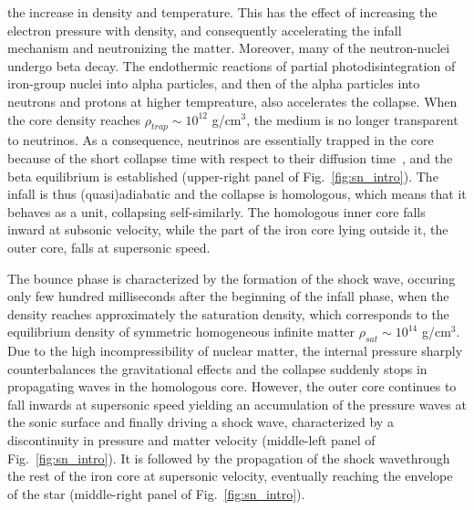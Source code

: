 the increase in density and temperature. This has the effect of increasing 
the electron pressure with density, and consequently accelerating the infall 
mechanism and neutronizing the matter. Moreover, many of the neutron-nuclei 
undergo beta decay.
The endothermic reactions of partial photodisintegration of iron-group nuclei 
into alpha particles, and then of the alpha particles into neutrons and protons 
at higher tempreature, also accelerates the collapse. When the core density 
reaches $\rho_{trap} \sim 10^{12}$ g/cm$^3$, the medium is no longer
transparent to neutrinos. As a consequence, neutrinos are essentially trapped 
in the core because of the short collapse time with respect to their diffusion
time~\cite{Bethe1990}, and the beta equilibrium is established (upper-right 
panel of Fig.~\ref{fig:sn_intro}).
The infall is thus (quasi)adiabatic and the collapse is homologous,
which means that it behaves as a unit, collapsing self-similarly. 
The homologous inner core falls inward at subsonic velocity, while
the part of the iron core lying outside it, the outer core, falls at supersonic 
speed.

The bounce phase is characterized by the formation of the shock wave, occuring 
only few hundred milliseconds after the beginning of the infall phase, when the 
density reaches approximately the saturation density, which corresponds to the 
equilibrium density of symmetric homogeneous infinite matter $\rho_{sat} \sim 
10^{14}$ g/cm$^3$. 
Due to the high incompressibility of nuclear matter, the internal pressure 
sharply counterbalances the gravitational effects and the collapse suddenly 
stops in propagating waves in the homologous core. However, the outer core 
continues to fall inwards at supersonic speed yielding an accumulation of the 
pressure waves at the sonic surface and finally driving a shock 
wave, characterized by a discontinuity in pressure and matter velocity 
(middle-left panel of Fig.~\ref{fig:sn_intro}). 
It is followed by the propagation of the shock wavethrough the rest of the iron 
core at supersonic velocity, eventually reaching the envelope of the star 
(middle-right panel of Fig.~\ref{fig:sn_intro}).

